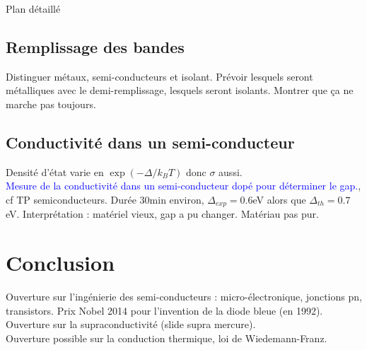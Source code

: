 \begin{reportBlock}{Plan détaillé}
\subsection{Remplissage des bandes}

Distinguer métaux, semi-conducteurs et isolant. Prévoir lesquels seront métalliques avec le demi-remplissage, lesquels seront isolants. Montrer que ça ne marche pas toujours.
\subsection{Conductivité dans un semi-conducteur}
Densité d'état varie en $\exp(-\Delta/k_BT)$ donc $\sigma$ aussi.\\

\textcolor{blue}{Mesure de la conductivité dans un semi-conducteur dopé pour déterminer le gap.}, cf TP semiconducteurs. Durée 30min environ, $\Delta_{exp}=0.6$eV alors que $\Delta_{th}=0.7$eV. Interprétation : matériel vieux, gap a pu changer. Matériau pas pur.\\
\section{Conclusion}
Ouverture sur l'ingénierie des semi-conducteurs : micro-électronique, jonctions pn, transistors. Prix Nobel 2014 pour l'invention de la diode bleue (en 1992).\\
Ouverture sur la supraconductivité (slide supra mercure).\\
Ouverture possible sur la conduction thermique, loi de Wiedemann-Franz.

\end{reportBlock}